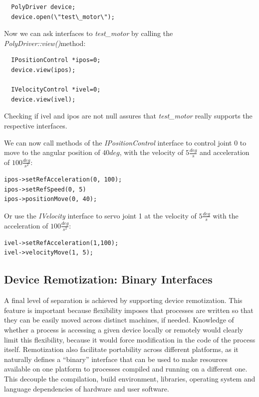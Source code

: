 \begin{verbatim}
  PolyDriver device;
  device.open(\"test\_motor\");
\end{verbatim}

Now we can ask interfaces to \emph{test\_motor} by calling the 
\emph{PolyDriver::view()}method:

\begin{verbatim}
  IPositionControl *ipos=0;
  device.view(ipos);

  IVelocityControl *ivel=0;
  device.view(ivel);
\end{verbatim}

Checking if ivel and ipos are not null assures that \emph{test\_motor} 
really supports the respective interfaces.

We can now call methods of the \emph{IPositionControl} interface to control 
joint $0$ to move to the angular position of $40deg$, with the velocity 
of $5\frac{deg}{s}$ and acceleration of $100\frac{deg}{s^2}$:

\begin{verbatim}
ipos->setRefAcceleration(0, 100);
ipos->setRefSpeed(0, 5)
ipos->positionMove(0, 40);
\end{verbatim}

Or use the \emph{IVelocity} interface to servo joint 1 at the velocity 
of $5\frac{deg}{s}$ with the acceleration of $100\frac{deg}{s^2}$:

\begin{verbatim}
ivel->setRefAcceleration(1,100);
ivel->velocityMove(1, 5);
\end{verbatim}

\subsection{Device Remotization: Binary Interfaces}
A final level of separation is achieved by supporting device remotization. 
This feature is important because flexibility imposes 
that processes are written so that they can be easily moved across 
distinct machines, if needed. Knowledge of whether a process is accessing 
a given device locally or remotely would clearly limit this flexibility, 
because it would force modification in the code of the process itself. 
Remotization also facilitate portability across different platforms, as 
it naturally defines a ``binary'' interface that can 
be used to make resources available on one platform to processes compiled 
and running on a different one. This decouple the compilation, build 
environment, libraries, operating system and language dependencies of 
hardware and user software.

